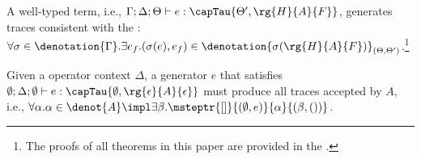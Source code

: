  
\begin{theorem}\label{theorem:fundamental}A well-typed term, i.e., \(\Gamma; \Delta; \Theta \vdash e : \capTau{\Theta', \rg{H}{A}{F}}\), generates traces consistent with the \PAT: $\forall \sigma \in \denotation{\Gamma}. \exists e_f. (\sigma(e), e_f) \in \denotation{\sigma(\rg{H}{A}{F})}_{(\Theta, \Theta')}$.\footnote{The proofs of all theorems in this paper are provided in the \techreport{}.}
\end{theorem}

\begin{corollary}\label{theorem:sound} Given a operator context \(\Delta\), a generator \(e\) that satisfies \(\emptyset;\Delta;\emptyset \vdash e : \capTau{\emptyset, \rg{\epsilon}{A}{\epsilon}}\) must produce all traces accepted by $A$, i.e., $\forall \alpha. \alpha \in \denot{A} \impl \exists \beta.\msteptr{[]}{(\emptyset, e)}{\alpha}{(\beta, ())}$.
\end{corollary}
